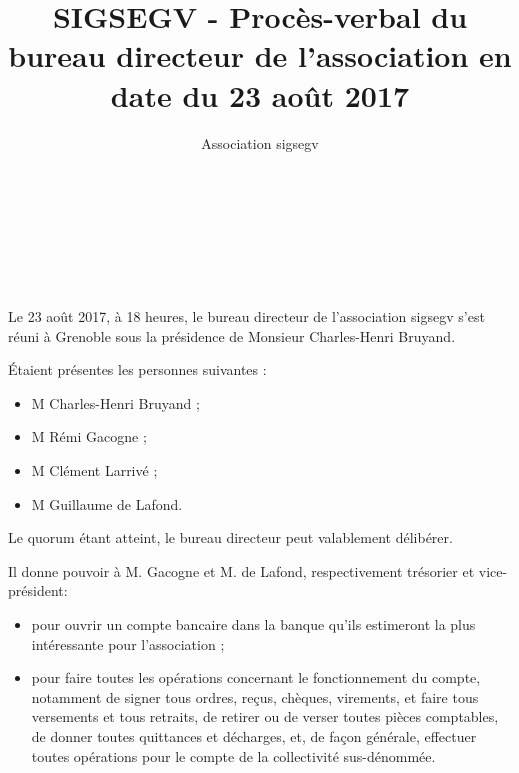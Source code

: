 \documentclass[a4paper,oneside,10pt]{article}
\begin{document}

\author{Association sigsegv}
\title{SIGSEGV - Procès-verbal du bureau directeur de l'association en date du 23 août 2017}

{ \\
}
\vspace{5mm}
{\centering {\textbf {\Huge -}}\\
}
\vspace{5mm}
{\\
}


\section*{}

Le 23 août 2017, à 18 heures, le bureau directeur de l'association sigsegv s'est réuni à Grenoble sous la présidence de Monsieur Charles-Henri Bruyand.

\'Etaient présentes les personnes suivantes :

\begin{itemize}
\item M Charles-Henri Bruyand ;
\item M Rémi Gacogne ;
\item M Clément Larrivé ;
\item M Guillaume de Lafond.
\end{itemize}

Le quorum étant atteint, le bureau directeur peut valablement délibérer.

Il donne pouvoir à M. Gacogne et M. de Lafond, respectivement trésorier et vice-président:\\
\begin{itemize}
  \item pour ouvrir un compte bancaire dans la banque qu'ils estimeront la plus intéressante pour l'association ;
  \item pour faire toutes les opérations concernant le fonctionnement du compte, notamment de signer tous ordres,
    reçus, chèques, virements, et faire tous versements et tous retraits,
    de retirer ou de verser toutes pièces comptables, de donner toutes quittances et décharges, et, de façon
    générale, effectuer toutes opérations pour le compte de la collectivité sus-dénommée.\\
\end{itemize}
\end{document}
